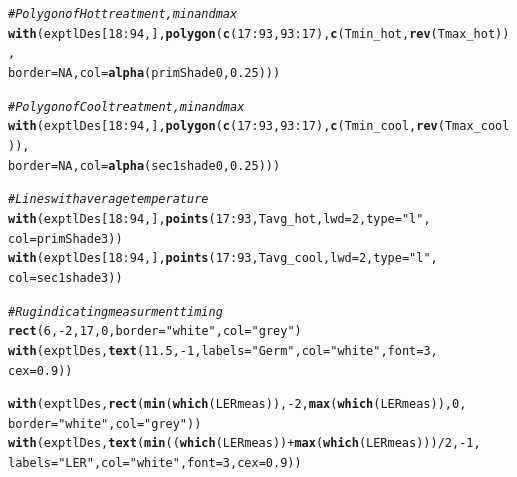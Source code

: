 \documentclass[11pt, oneside]{article}\usepackage[]{graphicx}\usepackage[]{color}
\makeatletter
\newcommand{\hlnum}[1]{\textcolor[rgb]{0.686,0.059,0.569}{#1}}%
\newcommand{\hlstr}[1]{\textcolor[rgb]{0.192,0.494,0.8}{#1}}%
\newcommand{\hlcom}[1]{\textcolor[rgb]{0.678,0.584,0.686}{\textit{#1}}}%
\newcommand{\hlopt}[1]{\textcolor[rgb]{0,0,0}{#1}}%
\newcommand{\hlstd}[1]{\textcolor[rgb]{0.345,0.345,0.345}{#1}}%
\newcommand{\hlkwc}[1]{\textcolor[rgb]{0.333,0.667,0.333}{#1}}%
\newcommand{\hlkwd}[1]{\textcolor[rgb]{0.737,0.353,0.396}{\textbf{#1}}}%
\newenvironment{kframe}{%
 \def\at@end@of@kframe{}%
 \ifinner\ifhmode%
  \def\at@end@of@kframe{\end{minipage}}%
  \begin{minipage}{\columnwidth}%
 \fi\fi%
 \def\FrameCommand##1{\hskip\@totalleftmargin \hskip-\fboxsep
 \colorbox{shadecolor}{##1}\hskip-\fboxsep
     \hskip-\linewidth \hskip-\@totalleftmargin \hskip\columnwidth}%
 \MakeFramed {\advance\hsize-\width
   \@totalleftmargin\z@ \linewidth\hsize
   \@setminipage}}%
 {\par\unskip\endMakeFramed%
 \at@end@of@kframe}
\newenvironment{knitrout}{}{} %
\makeatother
\begin{document}
\begin{knitrout}
\begin{kframe}
\begin{alltt}
\hlcom{# Polygon of Hot treatment, min and max}
\hlkwd{with}\hlstd{(exptlDes[}\hlnum{18}\hlopt{:}\hlnum{94}\hlstd{, ],} \hlkwd{polygon}\hlstd{(}\hlkwd{c}\hlstd{(}\hlnum{17}\hlopt{:}\hlnum{93}\hlstd{,} \hlnum{93}\hlopt{:}\hlnum{17}\hlstd{),} \hlkwd{c}\hlstd{(Tmin_hot,} \hlkwd{rev}\hlstd{(Tmax_hot)),}
  \hlkwc{border} \hlstd{=} \hlnum{NA}\hlstd{,} \hlkwc{col} \hlstd{=} \hlkwd{alpha}\hlstd{(primShade0,} \hlnum{0.25}\hlstd{)))}

\hlcom{# Polygon of Cool treatment, min and max}
\hlkwd{with}\hlstd{(exptlDes[}\hlnum{18}\hlopt{:}\hlnum{94}\hlstd{, ],} \hlkwd{polygon}\hlstd{(}\hlkwd{c}\hlstd{(}\hlnum{17}\hlopt{:}\hlnum{93}\hlstd{,} \hlnum{93}\hlopt{:}\hlnum{17}\hlstd{),} \hlkwd{c}\hlstd{(Tmin_cool,} \hlkwd{rev}\hlstd{(Tmax_cool)),}
  \hlkwc{border} \hlstd{=} \hlnum{NA}\hlstd{,} \hlkwc{col} \hlstd{=} \hlkwd{alpha}\hlstd{(sec1shade0,} \hlnum{0.25}\hlstd{)))}

\hlcom{# Lines with average temperature}
\hlkwd{with}\hlstd{(exptlDes[}\hlnum{18}\hlopt{:}\hlnum{94}\hlstd{, ],} \hlkwd{points}\hlstd{(}\hlnum{17}\hlopt{:}\hlnum{93}\hlstd{, Tavg_hot,} \hlkwc{lwd} \hlstd{=} \hlnum{2}\hlstd{,} \hlkwc{type} \hlstd{=} \hlstr{"l"}\hlstd{,}
        \hlkwc{col} \hlstd{= primShade3))}
\hlkwd{with}\hlstd{(exptlDes[}\hlnum{18}\hlopt{:}\hlnum{94}\hlstd{, ],} \hlkwd{points}\hlstd{(}\hlnum{17}\hlopt{:}\hlnum{93}\hlstd{, Tavg_cool,} \hlkwc{lwd} \hlstd{=} \hlnum{2}\hlstd{,} \hlkwc{type} \hlstd{=} \hlstr{"l"}\hlstd{,}
        \hlkwc{col} \hlstd{= sec1shade3))}

\hlcom{# Rug indicating measurment timing}
\hlkwd{rect}\hlstd{(}\hlnum{6}\hlstd{,} \hlopt{-}\hlnum{2}\hlstd{,} \hlnum{17}\hlstd{,} \hlnum{0}\hlstd{,} \hlkwc{border} \hlstd{=} \hlstr{"white"}\hlstd{,} \hlkwc{col} \hlstd{=} \hlstr{"grey"}\hlstd{)}
\hlkwd{with}\hlstd{(exptlDes,} \hlkwd{text}\hlstd{(}\hlnum{11.5}\hlstd{,} \hlopt{-}\hlnum{1}\hlstd{,} \hlkwc{labels} \hlstd{=} \hlstr{"Germ"}\hlstd{,} \hlkwc{col} \hlstd{=} \hlstr{"white"}\hlstd{,} \hlkwc{font} \hlstd{=} \hlnum{3}\hlstd{,}
  \hlkwc{cex} \hlstd{=} \hlnum{0.9}\hlstd{))}

\hlkwd{with}\hlstd{(exptlDes,} \hlkwd{rect}\hlstd{(}\hlkwd{min}\hlstd{(}\hlkwd{which}\hlstd{(LERmeas)),} \hlopt{-}\hlnum{2}\hlstd{,} \hlkwd{max}\hlstd{(}\hlkwd{which}\hlstd{(LERmeas)),} \hlnum{0}\hlstd{,}
        \hlkwc{border} \hlstd{=} \hlstr{"white"}\hlstd{,} \hlkwc{col} \hlstd{=} \hlstr{"grey"}\hlstd{))}
\hlkwd{with}\hlstd{(exptlDes,} \hlkwd{text}\hlstd{(}\hlkwd{min}\hlstd{((}\hlkwd{which}\hlstd{(LERmeas))} \hlopt{+} \hlkwd{max}\hlstd{(}\hlkwd{which}\hlstd{(LERmeas)))} \hlopt{/} \hlnum{2}\hlstd{,} \hlopt{-}\hlnum{1}\hlstd{,}
        \hlkwc{labels} \hlstd{=} \hlstr{"LER"}\hlstd{,} \hlkwc{col} \hlstd{=} \hlstr{"white"}\hlstd{,} \hlkwc{font} \hlstd{=} \hlnum{3}\hlstd{,} \hlkwc{cex} \hlstd{=} \hlnum{0.9}\hlstd{))}


\end{alltt}
\end{kframe}
\end{knitrout}
\end{document}

